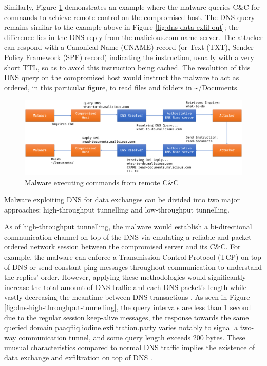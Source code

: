 \documentclass[a4paper]{report}
\begin{document}
Similarly, Figure \ref{fig:dns-data-exfil-cycle} demonstrates an example where the malware queries C\&C for commands to achieve remote control on the compromised host. The DNS query remains similar to the example above in Figure \ref{fig:dns-data-exfil-out}; the difference lies in the DNS reply from the \url{malicious.com} name server. The attacker can respond with a Canonical Name (CNAME) record (or Text (TXT), Sender Policy Framework (SPF) record) indicating the instruction, usually with a very short TTL, so as to avoid this instruction being cached. The resolution of this DNS query on the compromised host would instruct the malware to act as ordered, in this particular figure, to read files and folders in \url{~/Documents}.

\begin{figure}[h!]
  \includegraphics[width=\textwidth]{imgs/dns-data-exfil-cycle.png}
  \caption{Malware executing commands from remote C\&C}
  \label{fig:dns-data-exfil-cycle}
\end{figure}

Malware exploiting DNS for data exchanges can be divided into two major approaches: high-throughput tunnelling and low-throughput tunnelling.

As of high-throughput tunnelling, the malware would establish a bi-directional communication channel on top of the DNS via emulating a reliable and packet ordered network session between the compromised server and its C\&C. For example, the malware can enforce a Transmission Control Protocol (TCP) on top of DNS or send constant ping messages throughout communication to understand the replies' order. However, applying these methodologies would significantly increase the total amount of DNS traffic and each DNS packet's length while vastly decreasing the meantime between DNS transactions \cite{nadler-2017, nadler-201936}. As seen in Figure \ref{fig:dns-high-throughput-tunnelling}, the query intervals are less than 1 second due to the regular session keep-alive messages, the response towards the same queried domain \url{paaqfiiq.iodine.exfiltration.party} varies notably to signal a two-way communication tunnel, and some query length exceeds 200 bytes. These unusual characteristics compared to normal DNS traffic implies the existence of data exchange and exfiltration on top of DNS \cite{nadler-2017}.
\end{document}
